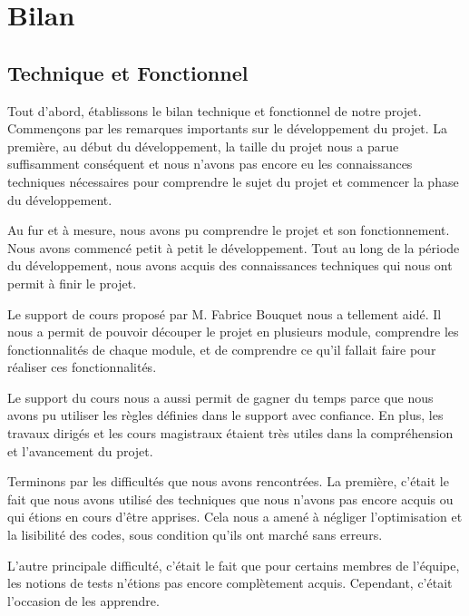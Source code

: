 \documentclass[a4paper,12pt]{report}
\begin{document}
\paragraph{}

\chapter{Bilan}
\section{Technique et Fonctionnel}
Tout d'abord, établissons le bilan technique et fonctionnel de notre projet. Commençons par les remarques importants sur le développement du projet. La première, au début du développement, la taille du projet nous a parue suffisamment conséquent et nous n'avons pas encore eu les connaissances techniques nécessaires pour comprendre le sujet du projet et commencer la phase du développement. 

Au fur et à mesure, nous avons pu comprendre le projet et son fonctionnement. Nous avons commencé petit à petit le développement. Tout au long de la période du développement, nous avons acquis des connaissances techniques qui nous ont permit à finir le projet.

Le support de cours proposé par M. Fabrice Bouquet nous a tellement aidé. Il nous a permit de pouvoir découper le projet en plusieurs module, comprendre les fonctionnalités de chaque module, et de comprendre ce qu'il fallait faire pour réaliser ces fonctionnalités.

Le support du cours nous a aussi permit de gagner du temps parce que nous avons pu utiliser les règles définies dans le support avec confiance. En plus, les travaux dirigés et les cours magistraux étaient très utiles dans la compréhension et l'avancement du projet.

Terminons par les difficultés que nous avons rencontrées. La première, c'était le fait que nous avons utilisé des techniques que nous n'avons pas encore acquis ou qui étions en cours d'être apprises. Cela nous a amené à négliger l'optimisation et la lisibilité des codes, sous condition qu'ils ont marché sans erreurs.

L'autre principale difficulté, c'était le fait que pour certains membres de l'équipe, les notions de tests n'étions pas encore complètement acquis. Cependant, c'était l'occasion de les apprendre.
\end{document}
